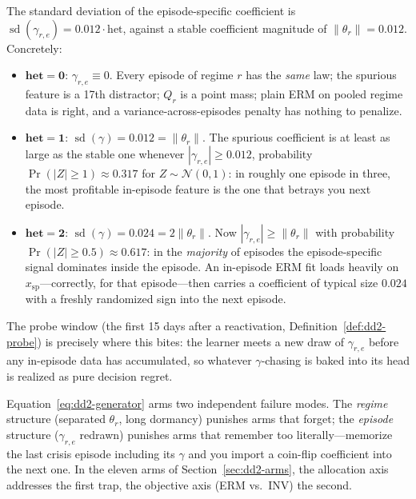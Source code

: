 \begin{example}[What $\mathrm{het} = 0$ versus $\mathrm{het} = 2$ means]
\label{ex:dd2-het}
The standard deviation of the episode-specific coefficient is
$\operatorname{sd}(\gamma_{r,e}) = 0.012 \cdot \mathrm{het}$, against a stable
coefficient magnitude of $\|\theta_r\| = 0.012$. Concretely:
\begin{itemize}
  \item $\mathbf{het = 0}$: $\gamma_{r,e} \equiv 0$. Every episode of regime
        $r$ has the \emph{same} law; the spurious feature is a 17th
        distractor; $Q_r$ is a point mass; plain ERM on pooled regime data
        is right, and a variance-across-episodes penalty has nothing to
        penalize.
  \item $\mathbf{het = 1}$: $\operatorname{sd}(\gamma) = 0.012 = \|\theta_r\|$.
        The spurious coefficient is at least as large as the stable one
        whenever $|\gamma_{r,e}| \ge 0.012$, probability
        $\Pr(|Z| \ge 1) \approx 0.317$ for $Z \sim \mathcal{N}(0,1)$: in
        roughly one episode in three, the most profitable in-episode feature
        is the one that betrays you next episode.
  \item $\mathbf{het = 2}$: $\operatorname{sd}(\gamma) = 0.024 = 2\|\theta_r\|$.
        Now $|\gamma_{r,e}| \ge \|\theta_r\|$ with probability
        $\Pr(|Z| \ge 0.5) \approx 0.617$: in the \emph{majority} of episodes
        the episode-specific signal dominates inside the episode. An
        in-episode ERM fit loads heavily on $x_{\mathrm{sp}}$---correctly,
        for that episode---then carries a coefficient of typical size
        $0.024$ with a freshly randomized sign into the next episode.
\end{itemize}
The probe window (the first 15 days after a reactivation,
Definition~\ref{def:dd2-probe}) is precisely where this bites: the learner
meets a new draw of $\gamma_{r,e}$ before any in-episode data has
accumulated, so whatever $\gamma$-chasing is baked into its head is realized
as pure decision regret.
\end{example}

\begin{intuition}[title={The generator is a forgetting--overfitting double trap}]
Equation~\eqref{eq:dd2-generator} arms two independent failure modes. The
\emph{regime} structure (separated $\theta_r$, long dormancy) punishes arms
that forget; the \emph{episode} structure ($\gamma_{r,e}$ redrawn) punishes
arms that remember too literally---memorize the last crisis episode including
its $\gamma$ and you import a coin-flip coefficient into the next one. In the
eleven arms of Section~\ref{sec:dd2-arms}, the allocation axis addresses the
first trap, the objective axis (ERM vs.\ INV) the second.
\end{intuition}

